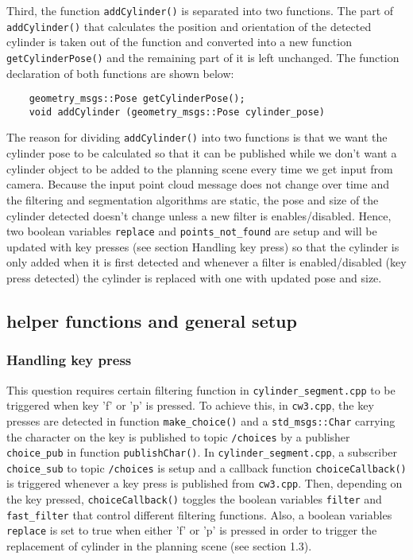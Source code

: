 \documentclass{homework}
\begin{document}
Third, the function \texttt{addCylinder()} is separated into two functions. The part of \texttt{addCylinder()} that calculates the position and orientation of the detected cylinder is taken out of the function and converted into a new function \texttt{getCylinderPose()} and the remaining part of it is left unchanged. The function declaration of both functions are shown below:
\begin{verbatim}
    geometry_msgs::Pose getCylinderPose();
    void addCylinder (geometry_msgs::Pose cylinder_pose)
\end{verbatim}
The reason for dividing \texttt{addCylinder()} into two functions is that we want the cylinder pose to be calculated so that it can be published while we don't want a cylinder object to be added to the planning scene every time we get input from camera. Because the input point cloud message does not change over time and the filtering and segmentation algorithms are static, the pose and size of the cylinder detected doesn't change unless a new filter is enables/disabled. Hence, two boolean variables \texttt{replace} and \texttt{points_not_found} are setup and will be updated with key presses (see section Handling key press) so that the cylinder is only added when it is first detected and whenever a filter is enabled/disabled (key press detected) the cylinder is replaced with one with updated pose and size.

\subsection*{helper functions and general setup}
\subsubsection*{Handling key press}\label{Sec:keyp}
This question requires certain filtering function in \texttt{cylinder_segment.cpp} to be triggered when key 'f' or 'p' is pressed. To achieve this, in \texttt{cw3.cpp}, the key presses are detected in function \texttt{make_choice()} and a \texttt{std_msgs::Char} carrying the character on the key is published to topic \texttt{/choices} by a publisher \texttt{choice_pub} in function \texttt{publishChar()}. In \texttt{cylinder_segment.cpp}, a subscriber \texttt{choice_sub} to topic \texttt{/choices} is setup and a callback function \texttt{choiceCallback()} is triggered whenever a key press is published from \texttt{cw3.cpp}. Then, depending on the key pressed, \texttt{choiceCallback()} toggles the boolean variables \texttt{filter} and \texttt{fast_filter} that control different filtering functions. Also, a boolean variables \texttt{replace} is set to true when either 'f' or 'p' is pressed in order to trigger the replacement of cylinder in the planning scene (see section 1.3). 
\end{document}
